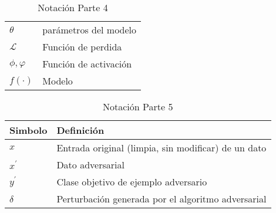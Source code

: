 \begin{table}[H]
\begin{center}
\begin{tabularx}{\textwidth}{|l|X|}
            $ \theta $                                 & parámetros del modelo                                                                                                                                                          \\
            $ \mathcal{L} $                            & Función de perdida                                                                                                                                                             \\
            $ \phi ,\varphi $                          & Función de activación                                                                                                                                                          \\
            $ f\left(\cdot\right) $                    & Modelo                                                                                                                                                                         \\

            \hline
        \end{tabularx}
        \caption{Notación Parte 4}
        \label{tab:nnotation-part-4}
    \end{center}
\end{table}

\begin{table}[H]
    \begin{center}
        \begin{tabularx}{\textwidth}{|l|X|}
            \hline
            \textbf{Simbolo} & \textbf{Definición}                                 \\
            \hline %
            $ x $            & Entrada original (limpia, sin modificar) de un dato \\
            $ x^{\prime} $   & Dato adversarial                                    \\
            $ y^{\prime} $   & Clase objetivo de ejemplo adversario                \\
            $ \delta $       & Perturbación generada por el algoritmo adversarial  \\
            \hline
        \end{tabularx}
        \caption{Notación Parte 5}
        \label{tab:nnotation-part-5}
    \end{center}
\end{table}



